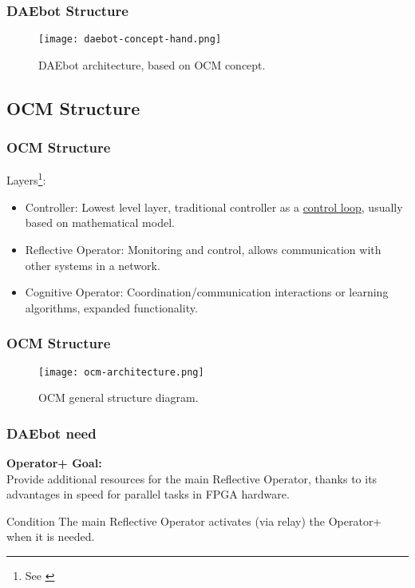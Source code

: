 \begin{frame}
	\frametitle{DAEbot Structure}
	\begin{figure}
		\texttt{[image: daebot-concept-hand.png]}
		\caption{DAEbot architecture, based on OCM concept.}\label{fig:daebot-concept-hand}
	\end{figure}
\end{frame}

\subsection{OCM Structure}

\begin{frame}
	\frametitle{OCM Structure}
	Layers\footnote[frame]{See \cite{Lueckel2001}}: \pause
	\begin{itemize}
		\item Controller: Lowest level layer, traditional controller as a \underline{control loop}, usually based on mathematical model. \pause
		\item Reflective Operator: Monitoring and control, allows communication with other systems in a network. \pause
		\item Cognitive Operator: Coordination/communication interactions or learning algorithms, expanded functionality.
	\end{itemize}
\end{frame}

\begin{frame}
	\frametitle{OCM Structure}
	\begin{figure}
		\texttt{[image: ocm-architecture.png]}
		\caption{OCM general structure diagram.}\label{fig:ocm-architecture}
	\end{figure}
\end{frame}

\begin{frame}
	\frametitle{DAEbot need}
	\textbf{\LARGE{Operator+ Goal:}} \\
	\large{Provide additional resources for the main Reflective Operator, thanks to its advantages in speed for parallel tasks in FPGA hardware.}
	\vfill \pause
	\begin{exampleblock}{Condition}
		The main Reflective Operator activates (via relay) the Operator+ when it is needed.
	\end{exampleblock}
\end{frame}